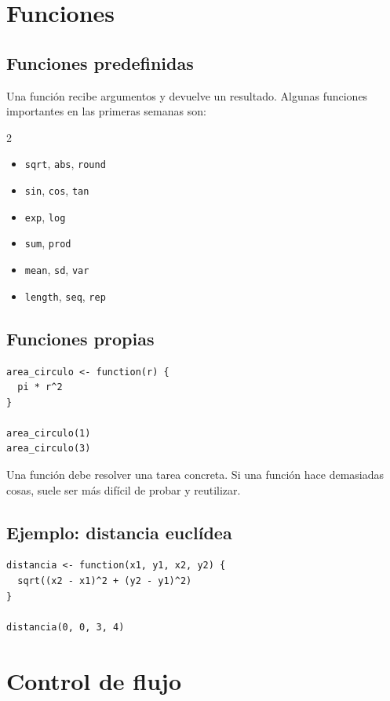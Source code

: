 \documentclass[11pt,a4paper,oneside]{book}
\begin{document}
\chapter{Funciones}

\section{Funciones predefinidas}
Una función recibe argumentos y devuelve un resultado. Algunas funciones importantes en las primeras semanas son:

\begin{multicols}{2}
\begin{itemize}
  \item \texttt{sqrt}, \texttt{abs}, \texttt{round}
  \item \texttt{sin}, \texttt{cos}, \texttt{tan}
  \item \texttt{exp}, \texttt{log}
  \item \texttt{sum}, \texttt{prod}
  \item \texttt{mean}, \texttt{sd}, \texttt{var}
  \item \texttt{length}, \texttt{seq}, \texttt{rep}
\end{itemize}
\end{multicols}

\section{Funciones propias}
\begin{lstlisting}[style=rstyle]
area_circulo <- function(r) {
  pi * r^2
}

area_circulo(1)
area_circulo(3)
\end{lstlisting}

Una función debe resolver una tarea concreta. Si una función hace demasiadas cosas, suele ser más difícil de probar y reutilizar.

\section{Ejemplo: distancia euclídea}
\begin{lstlisting}[style=rstyle]
distancia <- function(x1, y1, x2, y2) {
  sqrt((x2 - x1)^2 + (y2 - y1)^2)
}

distancia(0, 0, 3, 4)
\end{lstlisting}

\chapter{Control de flujo}
\end{document}
